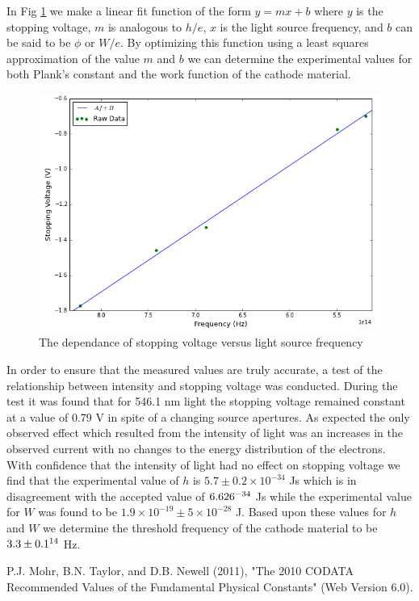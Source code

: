 \documentclass[prb,preprint]{revtex4-1}
\begin{document}
In Fig \ref{Lin_Fit} we make a linear fit function of the form $y=mx+b$ where $y$ is the stopping voltage, $m$ is analogous to $h/e$, $x$ is the light source frequency, and $b$ can be said to be $\phi$ or $W/e$. By optimizing this function using a least squares approximation of the value $m$ and $b$ we can determine the experimental values for both Plank's constant and the work function of the cathode material.

\begin{figure}[h!]
\centering
\includegraphics[width=.71\textwidth]{Lin_Fit.png}
\caption{The dependance of stopping voltage versus light source frequency}
\label{Lin_Fit}
\end{figure}

In order to ensure that the measured values are truly accurate, a test of the relationship between intensity and stopping voltage was conducted. During the test it was found that for 546.1 nm light the stopping voltage remained constant at a value of 0.79 V in spite of a changing source apertures. As expected the only observed effect which resulted from the intensity of light was an increases in the observed current with no changes to the energy distribution of the electrons. With confidence that the intensity of light had no effect on stopping voltage we find that the experimental value of $h$ is $5.7\pm0.2\times10^{-34}$ Js which is in disagreement with the accepted value of $6.626\time10^{-34}$ Js\cite{const} while the experimental value for $W$ was found to be $1.9\times10^{-19}\pm5\times10^{-28}$ J. Based upon these values for $h$ and $W$ we determine the threshold frequency of the cathode material to be $3.3\pm0.1\time10^{14}$ Hz.
\newpage

\begin{thebibliography}{99}

 P.J. Mohr, B.N. Taylor, and D.B. Newell (2011), "The 2010 CODATA Recommended Values of the Fundamental Physical Constants" (Web Version 6.0).

\end{thebibliography}
\end{document}
